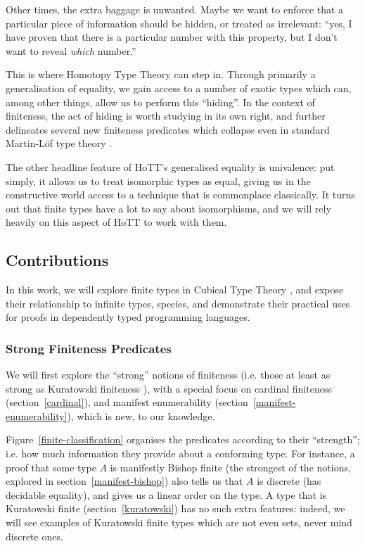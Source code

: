 Other times, the extra baggage is unwanted.
Maybe we want to enforce that a particular piece of information should be
hidden, or treated as irrelevant: ``yes, I have proven that there is a
particular number with this property, but I don't want to reveal \emph{which}
number.''

This is where Homotopy Type Theory \cite{hottbook} can step in.
Through primarily a generalisation of equality, we gain access to a number of
exotic types which can, among other things, allow us to perform this ``hiding''.
In the context of finiteness, the act of hiding is worth studying in its own
right, and further delineates several new finiteness predicates which collapse
even in standard Martin-Löf type theory
\cite{martin-lofIntuitionisticTypeTheory1980}.

The other headline feature of HoTT's generalised equality is univalence: put
simply, it allows us to treat isomorphic types as equal, giving us in the
constructive world access to a technique that is commonplace classically.
It turns out that finite types have a lot to say about isomorphisms, and we will
rely heavily on this aspect of HoTT to work with them.
\subsection{Contributions}
In this work, we will explore finite types in Cubical Type Theory
\cite{cohenCubicalTypeTheory2016}, and expose their relationship to infinite
types, species, and demonstrate their practical uses for proofs in dependently
typed programming languages.
\subsubsection{Strong Finiteness Predicates}
We will first explore the ``strong'' notions of finiteness (i.e. those at least
as strong as Kuratowski finiteness \cite{kuratowskiNotionEnsembleFini1920}),
with a special focus on cardinal finiteness (section~\ref{cardinal}), and
manifest enumerability (section~\ref{manifest-enumerability}), which is new, to
our knowledge.


Figure~\ref{finite-classification} organises the predicates according to
their ``strength''; i.e. how much information they provide about a conforming
type.
For instance, a proof that some type \(A\) is manifestly Bishop finite (the
strongest of the notions, explored in section~\ref{manifest-bishop}) also tells
us that \(A\) is discrete (has decidable equality), and gives us a linear order
on the type.
A type that is Kuratowski finite (section~\ref{kuratowski}) has no such extra
features: indeed, we will see examples of Kuratowski finite types which are not
even sets, never mind discrete ones.

